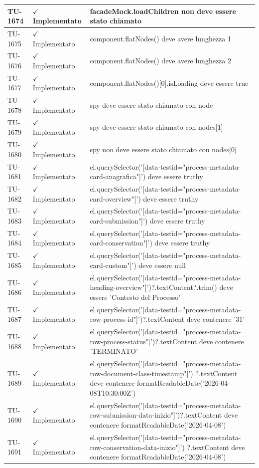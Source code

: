 ﻿\documentclass[a4paper,12pt]{article}
\newcommand{\ok}{\textcolor{green!60!black}{$\checkmark$ Implementato}}
\begin{document}
\begin{longtable}{|p{2cm}|p{3.5cm}|p{9.5cm}|}
\hline
TU-1674 & \ok & facadeMock.loadChildren non deve essere stato chiamato \\
\hline
TU-1675 & \ok & component.flatNodes() deve avere lunghezza 1 \\
\hline
TU-1676 & \ok & component.flatNodes() deve avere lunghezza 2 \\
\hline
TU-1677 & \ok & component.flatNodes()[0].isLoading deve essere true \\
\hline
TU-1678 & \ok & spy deve essere stato chiamato con node \\
\hline
TU-1679 & \ok & spy deve essere stato chiamato con nodes[1] \\
\hline
TU-1680 & \ok & spy non deve essere stato chiamato con nodes[0] \\
\hline
TU-1681 & \ok & el.querySelector('[data-testid="process-metadata-card-anagrafica"]') deve essere truthy \\
\hline
TU-1682 & \ok & el.querySelector('[data-testid="process-metadata-card-overview"]') deve essere truthy \\
\hline
TU-1683 & \ok & el.querySelector('[data-testid="process-metadata-card-submission"]') deve essere truthy \\
\hline
TU-1684 & \ok & el.querySelector('[data-testid="process-metadata-card-conservation"]') deve essere truthy \\
\hline
TU-1685 & \ok & el.querySelector('[data-testid="process-metadata-card-custom"]') deve essere null \\
\hline
TU-1686 & \ok & el.querySelector('[data-testid="process-metadata-heading-overview"]')?.textContent?.trim() deve essere 'Contesto del Processo' \\
\hline
TU-1687 & \ok & el.querySelector('[data-testid="process-metadata-row-process-id"]')?.textContent deve contenere '31' \\
\hline
TU-1688 & \ok & el.querySelector('[data-testid="process-metadata-row-process-status"]')?.textContent deve contenere 'TERMINATO' \\
\hline
TU-1689 & \ok & el.querySelector('[data-testid="process-metadata-row-document-class-timestamp"]') ?.textContent deve contenere formatReadableDate('2026-04-08T10:30:00Z') \\
\hline
TU-1690 & \ok & el.querySelector('[data-testid="process-metadata-row-submission-data-inizio"]')?.textContent deve contenere formatReadableDate('2026-04-08') \\
\hline
TU-1691 & \ok & el.querySelector('[data-testid="process-metadata-row-conservation-data-inizio"]') ?.textContent deve contenere formatReadableDate('2026-04-08') \\

\end{longtable}
\end{document}
